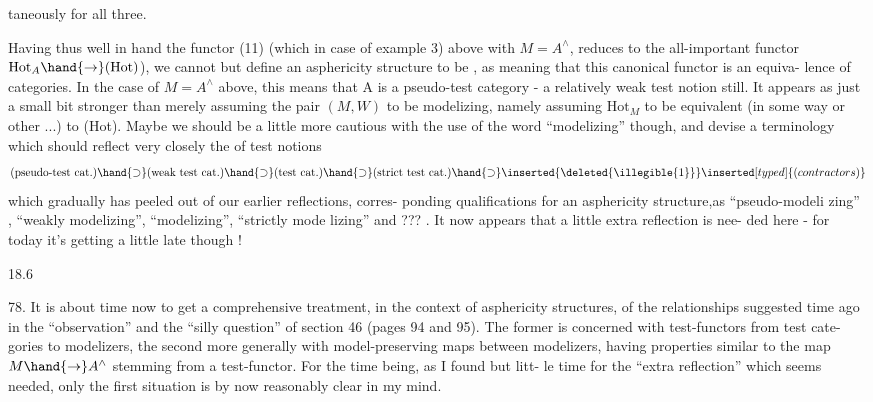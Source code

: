 taneously for all three.

Having thus well in hand the  functor (11) (which in
case of example  3) above with $M=A^{\wedge}$, reduces to the all-important
functor $\mathrm{Hot}_{A}\hand{\to}(\mathrm{Hot})$),  we cannot but define an asphericity structure
to be \hand{\uline{\textcolor{black}{modelizing}}} , as meaning that this canonical functor is an equiva-%
lence of categories. In the case of $M= A^{\wedge}$ above, this means that A
is a pseudo-test category - a relatively weak test notion still. It
appears as just a  small bit stronger than merely assuming the pair
$(M,W)$ to be modelizing,  namely assuming $\mathrm{Hot}_{M}$ to be equivalent (in some
way or other ...) to (Hot). Maybe we should be a little more cautious
with the use of the word ``modelizing'' though, and devise a terminology
which should reflect very closely the  of 
test notions
\[
\text{(pseudo-test cat.)}\hand{\supset}\text{(weak test cat.)}\hand{\supset}\text{(test cat.)}\hand{\supset}\text{(strict test cat.)}\hand{\supset} \inserted{\deleted{\illegible{1}}}\inserted[typed]{(contractors)}
\]
which gradually has peeled out of our earlier reflections,   corres-%
ponding qualifications for an asphericity structure,as  ``pseudo-modeli%
zing'' ,  ``weakly modelizing'', ``modelizing'', ``strictly mode%
lizing''\hand{,} and ??? . It now appears that a little extra reflection is nee-%
ded here - for today it's getting a little late though !

18.6

78. It is about time now to get a comprehensive treatment, in the
context of asphericity structures, of the relationships suggested time
ago in the ``observation'' and the ``silly question'' of section 46 (pages
94 and 95). The former is concerned with test-functors from test cate-%
gories to modelizers, the second more generally with model-preserving
maps between modelizers, having properties similar to the map $M\hand{\to} A^{\wedge}$
stemming from a test-functor. For the time being, as I found but litt-%
le time for the ``extra reflection'' which seems needed, only the first
situation is by now reasonably clear in my mind.


